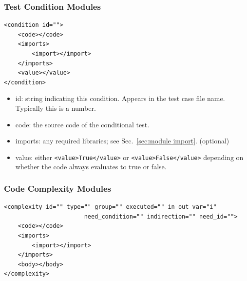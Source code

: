 \subsubsection{Test Condition Modules}
\label{sec: condition modules}

\begin{verbatim}
<condition id="">
    <code></code>
    <imports>
        <import></import>
    </imports>
    <value></value>
</condition>
\end{verbatim}

\begin{itemize}
    \item id: string indicating this condition.  Appears in the test case
      file name.  Typically this is a number.

    \item code: the source code of the conditional test.

    \item imports: any required libraries; see Sec.~\ref{sec:module import}. (optional)

    \item value: either \verb|<value>True</value>| or
        \verb|<value>False</value>| depending on \\
        whether the code always evaluates to true or false.
\end{itemize}


\subsubsection{Code Complexity Modules}
\label{sec: complexity modules}

\begin{verbatim}
<complexity id="" type="" group="" executed="" in_out_var="i" 
                       need_condition="" indirection="" need_id="">
    <code></code>
    <imports>
        <import></import>
    </imports>
    <body></body>
</complexity>
\end{verbatim}

